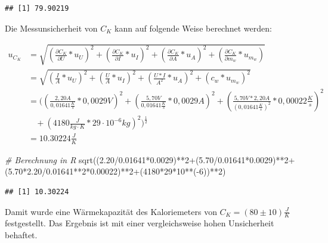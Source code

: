 \documentclass[
  9pt,
]{article}
\newenvironment{Shaded}{\begin{snugshade}}{\end{snugshade}}
\newcommand{\CommentTok}[1]{\textcolor[rgb]{0.56,0.35,0.01}{\textit{#1}}}
\newcommand{\DecValTok}[1]{\textcolor[rgb]{0.00,0.00,0.81}{#1}}
\newcommand{\FloatTok}[1]{\textcolor[rgb]{0.00,0.00,0.81}{#1}}
\newcommand{\FunctionTok}[1]{\textcolor[rgb]{0.00,0.00,0.00}{#1}}
\newcommand{\NormalTok}[1]{#1}
\newcommand{\SpecialCharTok}[1]{\textcolor[rgb]{0.00,0.00,0.00}{#1}}
\begin{document}
\begin{verbatim}
## [1] 79.90219
\end{verbatim}

Die Messunsicherheit von \(C_K\) kann auf folgende Weise berechnet
werden:

\begin{equation*}
\begin{split}
u_{C_K} &= \sqrt{(\frac{\partial C_K}{\partial U}*u_U)^2+(\frac{\partial C_K}{\partial I}*u_I)^2+(\frac{\partial C_K}{\partial A}*u_A)^2+(\frac{\partial C_K}{\partial m_w}*u_{m_w})}\\
&=\sqrt{(\frac{I}{A}*u_U)^2+(\frac{U}{A}*u_I)^2+(\frac{U*I}{A^2}*u_A)^2+(c_w*u_{m_w})^2}\\
&= ((\frac{2,20A}{0,01641\frac{K}{s}}*0,0029V)^2+(\frac{5,70V}{0,01641\frac{K}{s}}*0,0029A)^2+(\frac{5,70V*2,20A}{(0,01641\frac{K}{s})^2}*0,00022\frac{K}{s})^2\\
&\ \ \ \ +(4180\frac{J}{kg\cdot K}*29\cdot 10^{-6}kg)^2)^{\frac{1}{2}}\\
&= 10.30224 \frac{J}{K}
\end{split}
\end{equation*}

\begin{Shaded}
\begin{Highlighting}[]
\CommentTok{\# Berechnung in R}
\FunctionTok{sqrt}\NormalTok{((}\FloatTok{2.20}\SpecialCharTok{/}\FloatTok{0.01641}\SpecialCharTok{*}\FloatTok{0.0029}\NormalTok{)}\SpecialCharTok{**}\DecValTok{2}\SpecialCharTok{+}\NormalTok{(}\FloatTok{5.70}\SpecialCharTok{/}\FloatTok{0.01641}\SpecialCharTok{*}\FloatTok{0.0029}\NormalTok{)}\SpecialCharTok{**}\DecValTok{2}\SpecialCharTok{+}
\NormalTok{       (}\FloatTok{5.70}\SpecialCharTok{*}\FloatTok{2.20}\SpecialCharTok{/}\FloatTok{0.01641}\SpecialCharTok{**}\DecValTok{2}\SpecialCharTok{*}\FloatTok{0.00022}\NormalTok{)}\SpecialCharTok{**}\DecValTok{2}\SpecialCharTok{+}\NormalTok{(}\DecValTok{4180}\SpecialCharTok{*}\DecValTok{29}\SpecialCharTok{*}\DecValTok{10}\SpecialCharTok{**}\NormalTok{(}\SpecialCharTok{{-}}\DecValTok{6}\NormalTok{))}\SpecialCharTok{**}\DecValTok{2}\NormalTok{)}
\end{Highlighting}
\end{Shaded}

\begin{verbatim}
## [1] 10.30224
\end{verbatim}

Damit wurde eine Wärmekapazität des Kaloriemeters von
\(C_K=(80 \pm 10)\frac{J}{K}\) festgestellt. Das Ergebnis ist mit einer
vergleichsweise hohen Unsicherheit behaftet.
\end{document}
